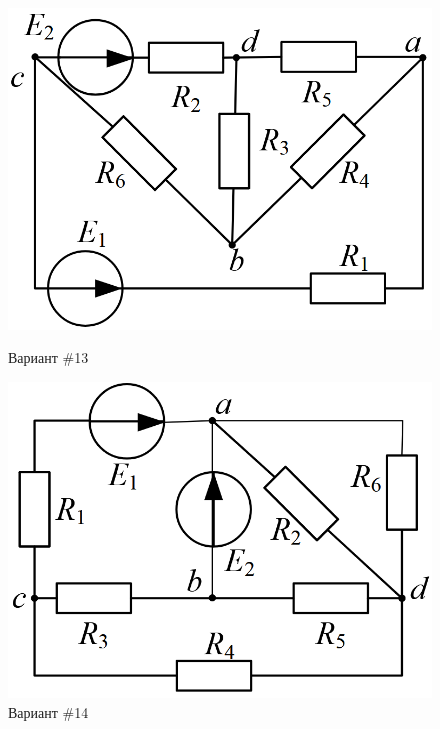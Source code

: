 \begin{figure}[H]
    \centering
    \begin{minipage}{0.48\textwidth}
        \centering
        \includegraphics[width=\textwidth]{images/13_task.png}
        \caption{Вариант \#13}
        \label{fig:task_13}
    \end{minipage}
    \hfill
    \begin{minipage}{0.48\textwidth}
        \centering
        \includegraphics[width=\textwidth]{images/14_task.png}
        \caption{Вариант \#14}
        \label{fig:task_14}
    \end{minipage}
\end{figure}

